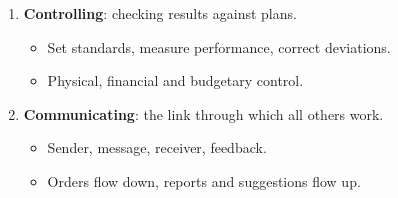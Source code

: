 {\begin{enumerate}[start=5]
    action'' (Mooney \& Reiley).
  \begin{itemize}
    \item Synchronizes departments so no one works against another.
    \item Internal, external, vertical, horizontal.
  \end{itemize}
  \item \textbf{Controlling}: checking results against plans.
  \begin{itemize}
    \item Set standards, measure performance, correct deviations.
    \item Physical, financial and budgetary control.
  \end{itemize}
  \item \textbf{Communicating}: the link through which all others work.
  \begin{itemize}
    \item Sender, message, receiver, feedback.
    \item Orders flow down, reports and suggestions flow up.
  \end{itemize}
\end{enumerate}}


